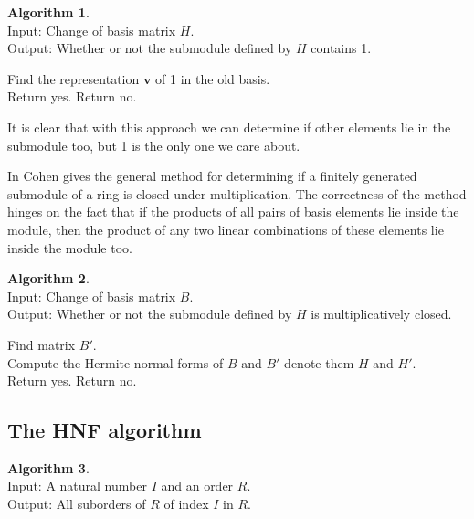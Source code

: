 \documentclass[12pt,a4paper,abstracton,bibtotoc]{scrreprt}
\theoremstyle{definition}
\newtheorem{alg}{Algorithm}
\begin{document}
\begin{alg}\label{alg:hasone}~\\
Input: Change of basis matrix $H$.\\
Output: Whether or not the submodule defined by $H$ contains 1.\\
\begin{algorithm}[H]
Find the representation $\mathbf v$ of 1 in the old basis.\\
{
Return yes.
}
{
Return no.
}
\end{algorithm}
\end{alg}

It is clear that with this approach we can determine if other elements lie in the submodule too, but 1 is the only one we care about.

In \cite{cohen93} Cohen gives the general method for determining if a finitely generated submodule of a ring is closed under multiplication.
The correctness of the method hinges on the fact that if the products of all pairs of basis elements lie inside the module, then the product of any two linear combinations of these elements lie inside the module too.

\begin{alg}
\label{alg:multclose}~\\
Input: Change of basis matrix $B$.\\
Output: Whether or not the submodule defined by $H$ is multiplicatively closed.\\
\begin{algorithm}[H]
Find matrix $B'$.\\ %
Compute the Hermite normal forms of $B$ and $B'$ denote them $H$ and $H'$.\\
{
Return yes.
}
{
Return no.
}
\end{algorithm}
\end{alg} 

\subsection{The HNF algorithm}
\begin{alg}~\\
Input: A natural number $I$ and an order $R$.\\
Output: All suborders of $R$ of index $I$ in $R$.\\
\begin{algorithm}[H]
\end{algorithm}
\end{alg}
\end{document}
